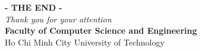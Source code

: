 \documentclass[aspectratio=169]{beamer}
\begin{document}

\begin{frame}
  \centering
  \vspace{1.2cm}
  \textbf{\Huge{- THE END -}}\\
  \vspace{0.5cm}
  \textit{\Large{Thank you for your attention}}\\
  \vspace{0.5cm}
  \textbf{Faculty of Computer Science and Engineering}\\
  Ho Chi Minh City University of Technology
\end{frame}
\end{document}
